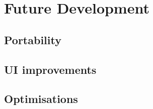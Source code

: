 \section{Future Development}

\subsection{Portability}

\subsection{UI improvements}

\subsection{Optimisations}
